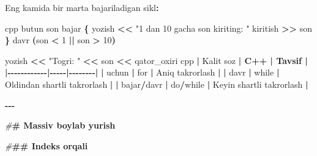 \documentclass[a4paper,11pt,twoside,openright]{book}
\newenvironment{Shaded}{\begin{snugshade}}{\end{snugshade}}
\newcommand{\CharTok}[1]{\textcolor[rgb]{0.31,0.60,0.02}{#1}}
\newcommand{\DecValTok}[1]{\textcolor[rgb]{0.00,0.00,0.81}{#1}}
\newcommand{\ErrorTok}[1]{\textcolor[rgb]{0.64,0.00,0.00}{\textbf{#1}}}
\newcommand{\NormalTok}[1]{#1}
\newcommand{\OperatorTok}[1]{\textcolor[rgb]{0.81,0.36,0.00}{\textbf{#1}}}
\newcommand{\PreprocessorTok}[1]{\textcolor[rgb]{0.56,0.35,0.01}{\textit{#1}}}
\newcommand{\StringTok}[1]{\textcolor[rgb]{0.31,0.60,0.02}{#1}}
\begin{document}
\begin{Shaded}
\begin{Highlighting}[]
\NormalTok{Eng kamida bir marta bajariladigan sikl}\OperatorTok{:}

\ErrorTok{\textasciigrave{}\textasciigrave{}\textasciigrave{}}\NormalTok{cpp}
\NormalTok{butun son}
\NormalTok{bajar }\OperatorTok{\{}
\NormalTok{    yozish }\OperatorTok{\textless{}\textless{}} \StringTok{"1 dan 10 gacha son kiriting: "}
\NormalTok{    kiritish }\OperatorTok{\textgreater{}\textgreater{}}\NormalTok{ son}
\OperatorTok{\}}\NormalTok{ davr }\OperatorTok{(}\NormalTok{son }\OperatorTok{\textless{}} \DecValTok{1} \OperatorTok{||}\NormalTok{ son }\OperatorTok{\textgreater{}} \DecValTok{10}\OperatorTok{)}

\NormalTok{yozish }\OperatorTok{\textless{}\textless{}} \StringTok{"To\textquotesingle{}g\textquotesingle{}ri: "} \OperatorTok{\textless{}\textless{}}\NormalTok{ son }\OperatorTok{\textless{}\textless{}}\NormalTok{ qator\_oxiri}
\ErrorTok{\textasciigrave{}\textasciigrave{}\textasciigrave{}}\NormalTok{cpp}
\OperatorTok{|}\NormalTok{ Kalit so}\CharTok{\textquotesingle{}z}\ErrorTok{ | C++ | Tavsif |}
\OperatorTok{|{-}{-}{-}{-}{-}{-}{-}{-}{-}{-}{-}{-}|{-}{-}{-}{-}{-}|{-}{-}{-}{-}{-}{-}{-}{-}|}
\OperatorTok{|} \ErrorTok{\textasciigrave{}}\NormalTok{uchun}\ErrorTok{\textasciigrave{}} \OperatorTok{|} \ErrorTok{\textasciigrave{}}\NormalTok{for}\ErrorTok{\textasciigrave{}} \OperatorTok{|}\NormalTok{ Aniq takrorlash }\OperatorTok{|}
\OperatorTok{|} \ErrorTok{\textasciigrave{}}\NormalTok{davr}\ErrorTok{\textasciigrave{}} \OperatorTok{|} \ErrorTok{\textasciigrave{}}\NormalTok{while}\ErrorTok{\textasciigrave{}} \OperatorTok{|}\NormalTok{ Oldindan shartli takrorlash }\OperatorTok{|}
\OperatorTok{|} \ErrorTok{\textasciigrave{}}\NormalTok{bajar}\ErrorTok{\textasciigrave{}}\OperatorTok{/}\ErrorTok{\textasciigrave{}}\NormalTok{davr}\ErrorTok{\textasciigrave{}} \OperatorTok{|} \ErrorTok{\textasciigrave{}}\NormalTok{do}\ErrorTok{\textasciigrave{}}\OperatorTok{/}\ErrorTok{\textasciigrave{}}\NormalTok{while}\ErrorTok{\textasciigrave{}} \OperatorTok{|}\NormalTok{ Keyin shartli takrorlash }\OperatorTok{|}

\OperatorTok{{-}{-}{-}}

\PreprocessorTok{\#}\ErrorTok{\# Massiv bo\textquotesingle{}ylab yurish}

\PreprocessorTok{\#}\ErrorTok{\#\# Indeks orqali}


\end{Highlighting}
\end{Shaded}
\end{document}
